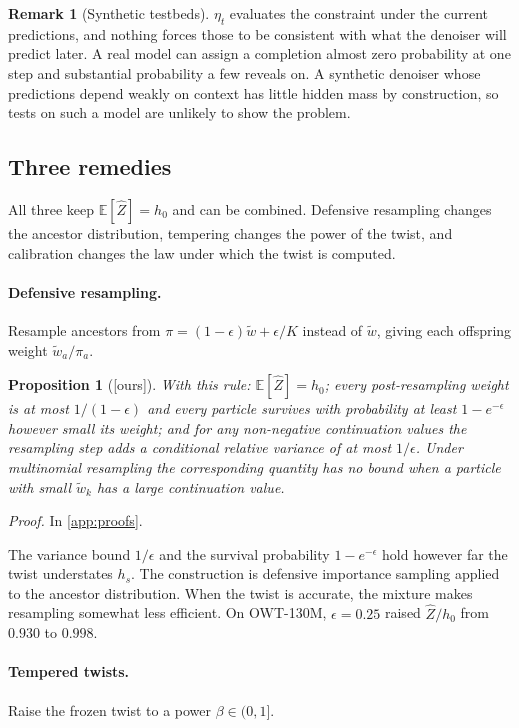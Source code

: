 \documentclass[11pt]{article}
\newtheorem{proposition}[theorem]{Proposition}
\theoremstyle{definition}
\newtheorem{remark}[theorem]{Remark}
\newcommand{\E}{\mathbb{E}}
\newcommand{\Zh}{\widehat Z}
\newcommand{\wt}{\tilde w}
\newcommand{\status}[1]{\textsf{\small[#1]}}
\newcommand{\proofref}[1]{\par\noindent\textit{Proof.} #1\par\smallskip}
\begin{document}
\begin{remark}[Synthetic testbeds]
$\eta_t$ evaluates the constraint under the current predictions, and nothing forces those to be consistent with
what the denoiser will predict later. A real model can assign a completion almost zero probability at one step
and substantial probability a few reveals on. A synthetic denoiser whose predictions depend weakly on context has
little hidden mass by construction, so tests on such a model are unlikely to show the problem.
\end{remark}

\subsection{Three remedies}
All three keep $\E[\Zh]=h_0$ and can be combined. Defensive resampling changes the ancestor distribution,
tempering changes the power of the twist, and calibration changes the law under which the twist is computed.

\paragraph{Defensive resampling.}
Resample ancestors from $\pi=(1-\epsilon)\wt+\epsilon/K$ instead of $\wt$, giving each offspring weight
$\wt_a/\pi_a$.

\begin{proposition}[\status{ours}]\label{prop:defensive}
With this rule: $\E[\Zh]=h_0$; every post-resampling weight is at most $1/(1-\epsilon)$ and every particle
survives with probability at least $1-e^{-\epsilon}$ \emph{however small its weight}; and for any non-negative
continuation values the resampling step adds a conditional relative variance of at most $1/\epsilon$. Under
multinomial resampling the corresponding quantity has no bound when a particle with small $\wt_k$ has a large
continuation value.
\end{proposition}
\proofref{In \cref{app:proofs}.}

The variance bound $1/\epsilon$ and the survival probability $1-e^{-\epsilon}$ hold however far the twist
understates $h_s$. The construction is defensive importance sampling \cite{hesterberg1995} applied to the ancestor
distribution. When the twist is accurate, the mixture makes resampling somewhat less efficient. On OWT-130M,
$\epsilon=0.25$ raised $\Zh/h_0$ from $0.930$ to $0.998$.

\paragraph{Tempered twists.}
Raise the frozen twist to a power $\beta\in(0,1]$.
\end{document}
